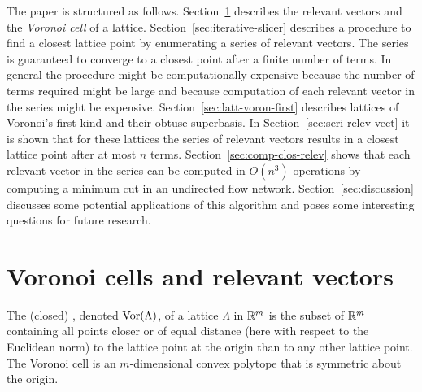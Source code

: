 \documentclass[final,leqno]{siamltex}
\begin{document}
The paper is structured as follows.  Section~\ref{sec:voron-cells-relev} describes the relevant vectors and the \emph{Voronoi cell} of a lattice. Section~\ref{sec:iterative-slicer} describes a procedure to find a closest lattice point by enumerating a series of relevant vectors.  The series is guaranteed to converge to a closest point after a finite number of terms.  In general the procedure might be computationally expensive because the number of terms required might be large and because computation of each relevant vector in the series might be expensive.  Section~\ref{sec:latt-voron-first} describes lattices of Voronoi's first kind and their obtuse superbasis.  In Section~\ref{sec:seri-relev-vect} it is shown that for these lattices the series of relevant vectors results in a closest lattice point after at most $n$ terms.  Section~\ref{sec:comp-clos-relev} shows that each relevant vector in the series can be computed in $O(n^3)$ operations by computing a minimum cut in an undirected flow network.  Section~\ref{sec:discussion} discusses some potential applications of this algorithm and poses some interesting questions for future research.

\section{Voronoi cells and relevant vectors}\label{sec:voron-cells-relev}
\newcommand{\calR}{\mathcal{R}}
The (closed) , denoted $\operatorname{Vor}(\Lambda)$, of a lattice $\Lambda$ in ${\mathbb R}^m$ is the subset of ${\mathbb R}^m$ containing all points closer or of equal distance (here with respect to the Euclidean norm) to the lattice point at the origin than to any other lattice point. The Voronoi cell is an $m$-dimensional convex polytope that is symmetric about the origin. %
 
\end{document}
